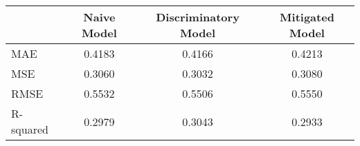 \begin{tabular}{lccc}
\toprule
{} &  Naive Model &  Discriminatory Model &  Mitigated Model \\
\midrule
MAE  &       0.4183 &                0.4166 &           0.4213 \\
MSE  &       0.3060 &                0.3032 &           0.3080 \\
RMSE &       0.5532 &                0.5506 &           0.5550 \\
R-squared   &       0.2979 &                0.3043 &           0.2933 \\
\bottomrule
\end{tabular}